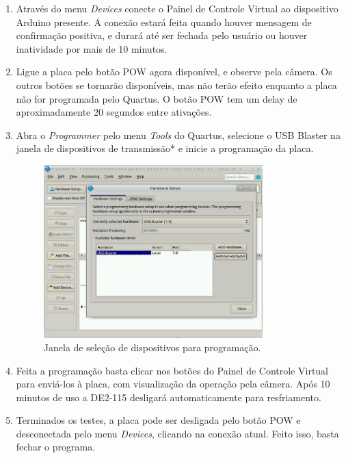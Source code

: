 \documentclass[12pt]{article}
\begin{document}
\begin{enumerate}[font=\bfseries]
    \item Através do menu \textit{Devices} conecte o Painel de Controle Virtual ao dispositivo Arduino presente. A conexão estará feita quando houver mensagem de confirmação positiva, e durará até ser fechada pelo usuário ou houver inatividade por mais de 10 minutos.

    \item Ligue a placa pelo botão POW agora disponível, e observe pela câmera.
    Os outros botões se tornarão disponíveis, mas não terão efeito enquanto a placa não for programada pelo Quartus.
    O botão POW tem um delay de aproximadamente 20 segundos entre ativações.

    \item Abra o \textit{Programmer} pelo menu \textit{Tools} do Quartus, selecione o USB Blaster na janela de dispositivos de transmissão* e inicie a programação da placa.
    
    \begin{figure}[H]
    \centering
    \includegraphics[width=0.8\textwidth]{img/usb-quartus.jpg}
    \caption{\label{ref:usb-quartus}Janela de seleção de dispositivos para programação.}
    \end{figure}

    \item Feita a programação basta clicar nos botões do Painel de Controle Virtual para enviá-los à placa, com visualização da operação pela câmera. Após 10 minutos de uso a DE2-115 desligará automaticamente para resfriamento.

    \item Terminados os testes, a placa pode ser desligada pelo botão POW e desconectada pelo menu \textit{Devices}, clicando na conexão atual. Feito isso, basta fechar o programa.
    

\end{enumerate}
\end{document}
